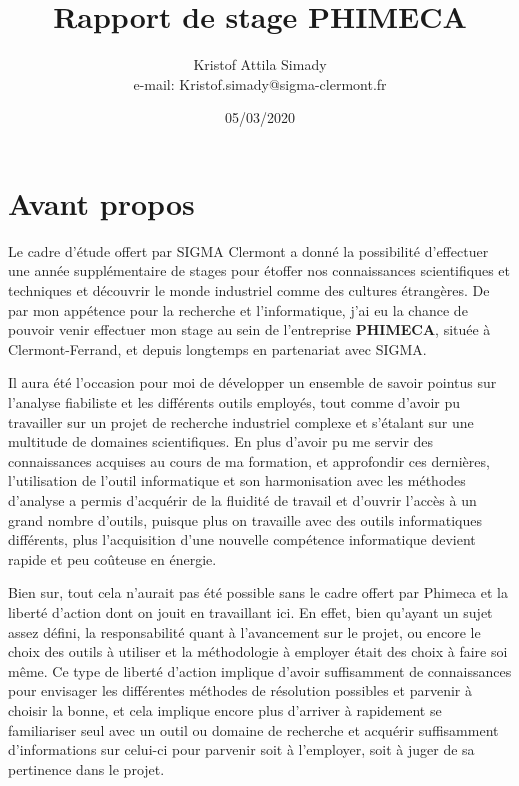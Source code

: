 \documentclass[a4paper,10pt]{article}
\begin{document}
%
   \title{Rapport de stage PHIMECA}

   \author{Kristof Attila Simady \\ e-mail: Kristof.simady@sigma-clermont.fr}
          
   \date{05/03/2020}

   \maketitle
   
  \newpage   
   
   \tableofcontents
 
  \newpage
    
\section*{Avant propos}

Le cadre d'étude offert par SIGMA Clermont a donné la possibilité d’effectuer une année supplémentaire de stages pour étoffer nos connaissances scientifiques et techniques  et découvrir le monde industriel comme des cultures étrangères.
De par mon appétence pour la recherche et l'informatique, j'ai eu la chance de pouvoir venir effectuer mon stage au sein de l'entreprise \textbf{PHIMECA}, située à Clermont-Ferrand, et depuis longtemps en partenariat avec SIGMA. \bigskip

Il aura été l'occasion pour moi de développer un ensemble de savoir pointus sur l'analyse fiabiliste et les différents outils employés, tout comme d'avoir pu travailler sur un projet de recherche industriel complexe et s'étalant sur une multitude de domaines scientifiques. En plus d'avoir pu me servir des connaissances acquises au cours de ma formation, et approfondir ces dernières, l'utilisation de l'outil informatique et son harmonisation avec les méthodes d'analyse a permis d'acquérir de la fluidité de travail et d'ouvrir l'accès à un grand nombre d'outils, puisque plus on travaille avec des outils informatiques différents, plus l'acquisition d'une nouvelle compétence informatique devient rapide et peu coûteuse en énergie. \par \bigskip

Bien sur, tout cela n'aurait pas été possible sans le cadre offert par Phimeca et la liberté d'action dont on jouit en travaillant ici. En effet, bien qu'ayant un sujet assez défini, la responsabilité quant à l'avancement sur le projet, ou encore le choix des outils à utiliser et la méthodologie à employer était des choix à faire soi même. Ce type de liberté d'action implique d'avoir suffisamment de connaissances pour envisager les différentes méthodes de résolution possibles et parvenir à choisir la bonne, et cela implique encore plus d'arriver à rapidement se familiariser seul avec un outil ou domaine de recherche et acquérir suffisamment d'informations sur celui-ci pour parvenir soit à l'employer, soit à juger de sa pertinence dans le projet. \bigskip
\end{document}

